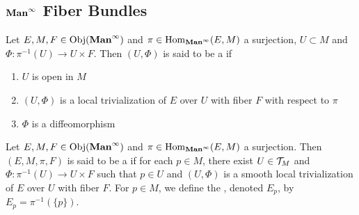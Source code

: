 \documentclass{book}
\begin{document}
	\subsection{$\operatorname*{\text{\textbf{Man}}^{\infty}}$ Fiber Bundles}
	
	\begin{defn} 
		Let $E, M, F \in \operatorname{Obj}(\operatorname*{\text{\textbf{Man}}^{\infty}})$ and $\pi \in \operatorname{Hom}_{\operatorname*{\text{\textbf{Man}}^{\infty}}}(E, M)$ a surjection, $U \subset M$ and $\Phi: \pi^{-1}(U) \rightarrow U \times F$. Then $(U, \Phi)$ is said to be a   if 
		\begin{enumerate}
			\item $U$ is open in $M$
			\item $(U, \Phi)$ is a local trivialization of $E$ over $U$ with fiber $F$ with respect to $\pi$
			\item $\Phi$ is a diffeomorphism
		\end{enumerate}
	\end{defn}

	\begin{defn} 
		Let $E,M, F \in \operatorname{Obj}(\operatorname*{\text{\textbf{Man}}^{\infty}})$ and $\pi \in \operatorname{Hom}_{\operatorname*{\text{\textbf{Man}}^{\infty}}}(E, M)$ a surjection. Then $(E, M, \pi, F)$ is said to be a  if for each $p \in M$, there exist $U \in \mathcal{T}_M$ and $\Phi: \pi^{-1}(U) \rightarrow U \times F$ such that $p \in U$ and $(U, \Phi)$ is a smooth local trivialization of $E$ over $U$ with fiber $F$. For $p \in M$, we define the , denoted $E_p$, by $E_p = \pi^{-1}(\{p\})$.
	\end{defn}
\end{document}
